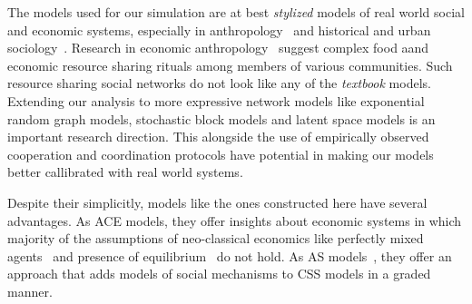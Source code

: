 \documentclass[sigconf]{acmart}
\begin{document}
The models used for our simulation are at best \textit{stylized} models of real world social and economic systems, especially in anthropology~\cite{white2011kinship} and historical and urban sociology~\cite{sampson2012great,katz2013people}. Research in economic anthropology~\cite{koster2019,koster2014,koster2015,bogerhoff2015,smith2019,nolin2012,power2018cooperation,power2018} suggest complex food aand economic resource sharing rituals among members of various communities. Such resource sharing social networks do not look like any of the \textit{textbook} models. Extending our analysis to more expressive network models like exponential random graph models, stochastic block models and latent space models is an important research direction. This alongside the use of empirically observed cooperation and coordination protocols have potential in making our models better callibrated with real world systems.   

Despite their simplicitly, models like the ones constructed here have several advantages.  As ACE models, they offer insights about economic systems in which majority of the assumptions of neo-classical economics like perfectly mixed agents~\cite{wilhite} and presence of equilibrium~\cite{arthur} do not hold. As AS models~\cite{hedstrom2011oxford}, they offer an approach that adds models of social mechanisms to CSS models in a graded manner.  





\end{document}
